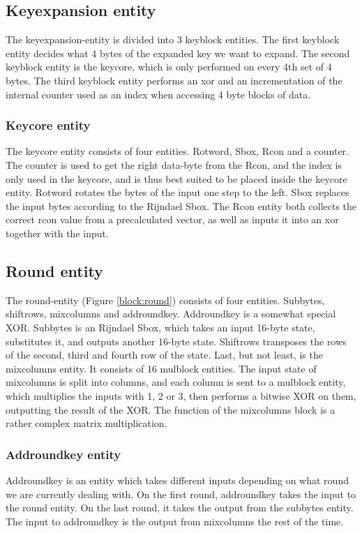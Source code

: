 \subsection{Keyexpansion entity}
The keyexpansion-entity is divided into 3 keyblock entities. The first keyblock 
entity decides what 4 bytes of the expanded key we want to expand. The second 
keyblock entity is the keycore, which is only performed on every 4th set of 
4 bytes. The third keyblock entity performs an xor and an incrementation of the 
internal counter used as an index when accessing 4 byte blocks of data.

\subsubsection{Keycore entity}
The keycore entity consists of four entities. Rotword, Sbox, Rcon and a counter. 
The counter is used to get the right data-byte from the Rcon, and the index is 
only used in the keycore, and is thus best suited to be placed inside the 
keycore entity. Rotword rotates the bytes of the input one step to the left. 
Sbox replaces the input bytes according to the Rijndael Sbox. The Rcon entity 
both collects the correct rcon value from a precalculated vector, as well as 
inputs it into an xor together with the input.

\subsection{Round entity}
The round-entity (Figure \ref{block:round}) consists of four entities. Subbytes, 
shiftrows, mixcolumns and addroundkey. Addroundkey is a somewhat special XOR. 
Subbytes is an Rijndael Sbox, which takes an input 16-byte state, substitutes 
it, and outputs another 16-byte state. Shiftrows transposes the rows of the 
second, third and fourth row of the state. Last, but not least, is the 
mixcolumns entity. It consists of 16 mulblock entities. The input state of 
mixcolumns is split into columns, and each column is sent to a mulblock entity, 
which multiplies the inputs with 1, 2 or 3, then performs a bitwise XOR on them, 
outputting the result of the XOR. The function of the mixcolumns block is a 
rather complex matrix multiplication.

\subsubsection{Addroundkey entity}
Addroundkey is an entity which takes different inputs depending on 
what round we are currently dealing with. On the first round, addroundkey takes 
the input to the round entity. On the last round, it takes the output from the 
subbytes entity. The input to addroundkey is the output from mixcolumns the rest 
of the time.

